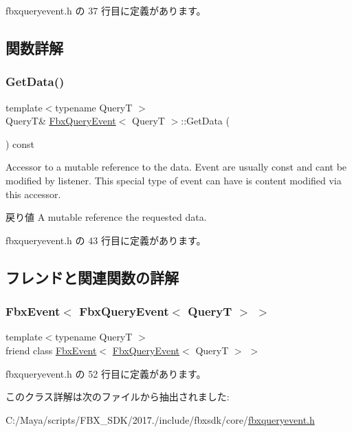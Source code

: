  fbxqueryevent.\+h の 37 行目に定義があります。



\subsection{関数詳解}
\mbox{\label{class_fbx_query_event_aff8c93540fbd84ec48c8fed06593e4b4}} 
\subsubsection{\texorpdfstring{Get\+Data()}{GetData()}}
{\footnotesize\ttfamily template$<$typename QueryT $>$ \\
QueryT\& \hyperlink{class_fbx_query_event}{Fbx\+Query\+Event}$<$ QueryT $>$\+::Get\+Data (\begin{DoxyParamCaption}{ }\end{DoxyParamCaption}) const\hspace{0.3cm}{\ttfamily [inline]}}

Accessor to a mutable reference to the data. Event are usually const and can\textquotesingle{}t be modified by listener. This special type of event can have is content modified via this accessor. \begin{DoxyReturn}{戻り値}
A mutable reference the requested data. 
\end{DoxyReturn}


 fbxqueryevent.\+h の 43 行目に定義があります。



\subsection{フレンドと関連関数の詳解}
\mbox{\label{class_fbx_query_event_ade3703dd283c116fbf29343f18ed9daa}} 
\subsubsection{\texorpdfstring{Fbx\+Event$<$ Fbx\+Query\+Event$<$ Query\+T $>$ $>$}{FbxEvent< FbxQueryEvent< QueryT > >}}
{\footnotesize\ttfamily template$<$typename QueryT $>$ \\
friend class \hyperlink{class_fbx_event}{Fbx\+Event}$<$ \hyperlink{class_fbx_query_event}{Fbx\+Query\+Event}$<$ QueryT $>$ $>$\hspace{0.3cm}{\ttfamily [friend]}}



 fbxqueryevent.\+h の 52 行目に定義があります。



このクラス詳解は次のファイルから抽出されました\+:\begin{DoxyCompactItemize}
\item 
C\+:/\+Maya/scripts/\+F\+B\+X\+\_\+\+S\+D\+K/2017./include/fbxsdk/core/\hyperlink{fbxqueryevent_8h}{fbxqueryevent.\+h}\end{DoxyCompactItemize}
